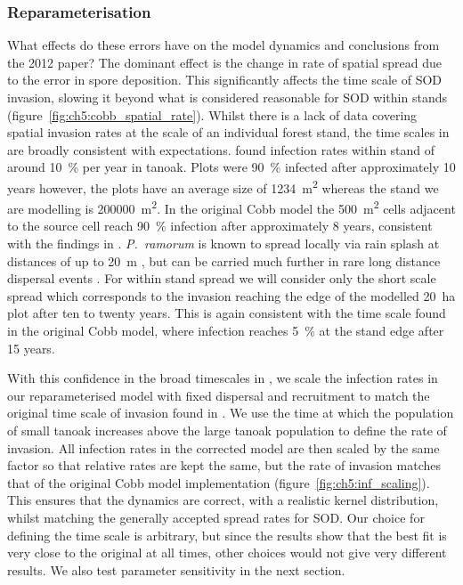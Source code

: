 \subsubsection{Reparameterisation}

What effects do these errors have on the model dynamics and conclusions from the 2012 paper? The dominant effect is the change in rate of spatial spread due to the error in spore deposition. This significantly affects the time scale of SOD invasion, slowing it beyond what is considered reasonable for SOD within stands (figure~\ref{fig:ch5:cobb_spatial_rate}). Whilst there is a lack of data covering spatial invasion rates at the scale of an individual forest stand, the time scales in \citet{cobb_ecosystem_2012} are broadly consistent with expectations. \citet{mcpherson_responses_2010} found infection rates within stand of around \SI{10}{\percent} per year in tanoak. Plots were \SI{90}{\percent} infected after approximately 10 years however, the plots have an average size of \SI{1234}{\meter\squared} whereas the stand we are modelling is \SI{200000}{\meter\squared}. In the original Cobb model the \SI{500}{\meter\squared} cells adjacent to the source cell reach \SI{90}{\percent} infection after approximately 8 years, consistent with the findings in \citet{mcpherson_responses_2010}. \textit{P.~ramorum} is known to spread locally via rain splash at distances of up to \SI{20}{\meter} \citep{davidson_transmission_2005}, but can be carried much further in rare long distance dispersal events \citep{meentemeyer_epidemiological_2011}. For within stand spread we will consider only the short scale spread which corresponds to the invasion reaching the edge of the modelled \SI{20}{\hectare} plot after ten to twenty years. This is again consistent with the time scale found in the original Cobb model, where infection reaches \SI{5}{\percent} at the stand edge after 15 years.

With this confidence in the broad timescales in \citet{cobb_ecosystem_2012}, we scale the infection rates in our reparameterised model with fixed dispersal and recruitment to match the original time scale of invasion found in \citet{cobb_ecosystem_2012}. We use the time at which the population of small tanoak increases above the large tanoak population to define the rate of invasion. All infection rates in the corrected model are then scaled by the same factor so that relative rates are kept the same, but the rate of invasion matches that of the original Cobb model implementation (figure~\ref{fig:ch5:inf_scaling}). This ensures that the dynamics are correct, with a realistic kernel distribution, whilst matching the generally accepted spread rates for SOD\@. Our choice for defining the time scale is arbitrary, but since the results show that the best fit is very close to the original at all times, other choices would not give very different results. We also test parameter sensitivity in the next section.

